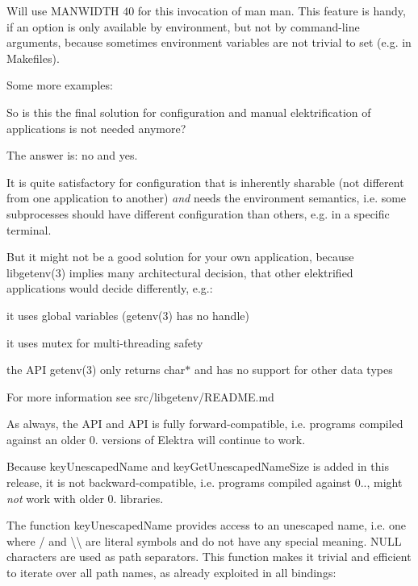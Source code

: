 Will use M\+A\+N\+W\+I\+D\+TH 40 for this invocation of man man. This feature is handy, if an option is only available by environment, but not by command-\/line arguments, because sometimes environment variables are not trivial to set (e.\+g. in Makefiles).

Some more examples\+:


\begin{DoxyCode}{0}
\end{DoxyCode}


So is this the final solution for configuration and manual elektrification of applications is not needed anymore?

The answer is\+: no and yes.

It is quite satisfactory for configuration that is inherently sharable (not different from one application to another) {\itshape and} needs the environment semantics, i.\+e. some subprocesses should have different configuration than others, e.\+g. in a specific terminal.

But it might not be a good solution for your own application, because libgetenv(3) implies many architectural decision, that other elektrified applications would decide differently, e.\+g.\+:


\begin{DoxyItemize}
\item it uses global variables (getenv(3) has no handle)
\item it uses mutex for multi-\/threading safety
\item the A\+PI getenv(3) only returns {\ttfamily char$\ast$} and has no support for other data types
\end{DoxyItemize}

For more information see src/libgetenv/\+R\+E\+A\+D\+ME.md

As always, the A\+PI and A\+PI is fully forward-\/compatible, i.\+e. programs compiled against an older 0. versions of Elektra will continue to work.

Because {\ttfamily key\+Unescaped\+Name} and {\ttfamily key\+Get\+Unescaped\+Name\+Size} is added in this release, it is not backward-\/compatible, i.\+e. programs compiled against 0.., might {\itshape not} work with older 0. libraries.

The function {\ttfamily key\+Unescaped\+Name} provides access to an unescaped name, i.\+e. one where {\ttfamily /} and {\ttfamily \textbackslash{}\textbackslash{}} are literal symbols and do not have any special meaning. {\ttfamily N\+U\+LL} characters are used as path separators. This function makes it trivial and efficient to iterate over all path names, as already exploited in all bindings\+:


